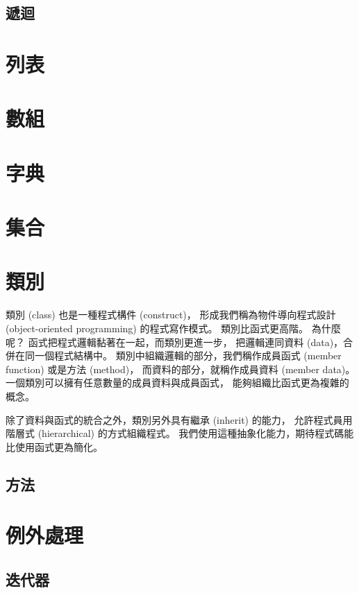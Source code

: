 \documentclass[a4paper,12pt]{book}
\theoremstyle{definition}
\begin{document}
\section{遞迴}

\chapter{列表}
%
\label{c:list}

\chapter{數組}
%
\label{c:tuple}

\chapter{字典}
%
\label{c:dict}

\chapter{集合}
%
\label{c:set}

\chapter{類別}
%
\label{c:class}

類別 (class) 也是一種程式構件 (construct)，
形成我們稱為物件導向程式設計 (object-oriented programming) 的程式寫作模式。
類別比函式更高階。
為什麼呢？
函式把程式邏輯黏著在一起，而類別更進一步，
把邏輯連同資料 (data)，合併在同一個程式結構中。
類別中組織邏輯的部分，我們稱作成員函式 (member function) 或是方法 (method)，
而資料的部分，就稱作成員資料 (member data)。
一個類別可以擁有任意數量的成員資料與成員函式，
能夠組織比函式更為複雜的概念。

除了資料與函式的統合之外，類別另外具有繼承 (inherit) 的能力，
允許程式員用階層式 (hierarchical) 的方式組織程式。
我們使用這種抽象化能力，期待程式碼能比使用函式更為簡化。

\section{方法}

\chapter{例外處理}
%
\label{c:exception}

\section{迭代器}
\end{document}
